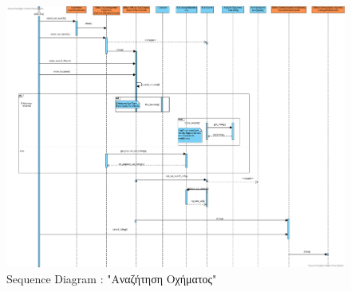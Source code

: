 \documentclass{../ol-softwaremanual}
\begin{document}
	
	\begin{figure}[htbp!]
		\centering
		\includegraphics[scale=0.29]{img/seq_car_search.png}
		\caption{\en Sequence Diagram : "\gr Αναζήτηση Οχήματος\en"\gr}
	\end{figure}
	
	
	\newpage
	\centering
\end{document}
